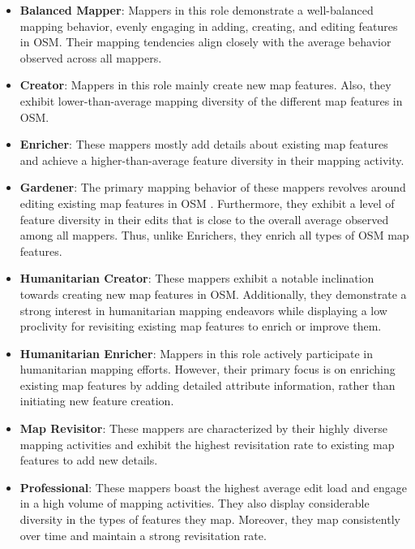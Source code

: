 \documentclass[manuscript,screen,review]{acmart}
\begin{document}
\begin{itemize}
\item \textbf{Balanced Mapper}: Mappers in this role demonstrate a well-balanced mapping behavior, evenly engaging in adding, creating, and editing features in OSM. Their mapping tendencies align closely with the average behavior observed across all mappers.

\item \textbf{Creator}: Mappers in this role mainly create new map features. Also, they exhibit lower-than-average mapping diversity of the different map features in OSM.

\item \textbf{Enricher}: These mappers mostly add details about existing map features and achieve a higher-than-average feature diversity in their mapping activity.

\item \textbf{Gardener}: The primary mapping behavior of these mappers revolves around editing existing map features in OSM \cite{MapGardenerMcConchie2013}. Furthermore, they exhibit a level of feature diversity in their edits that is close to the overall average observed among all mappers. Thus, unlike Enrichers, they enrich all types of OSM map features.

\item \textbf{Humanitarian Creator}: These mappers exhibit a notable inclination towards creating new map features in OSM. Additionally, they demonstrate a strong interest in humanitarian mapping endeavors while displaying a low proclivity for revisiting existing map features to enrich or improve them.

\item \textbf{Humanitarian Enricher}: Mappers in this role actively participate in humanitarian mapping efforts. However, their primary focus is on enriching existing map features by adding detailed attribute information, rather than initiating new feature creation.

\item \textbf{Map Revisitor}: These mappers are characterized by their highly diverse mapping activities and exhibit the highest revisitation rate to existing map features to add new details. 

\item \textbf{Professional}: These mappers boast the highest average edit load and engage in a high volume of mapping activities. They also display considerable diversity in the types of features they map. Moreover, they map consistently over time and maintain a strong revisitation rate.
\end{itemize}
\end{document}
